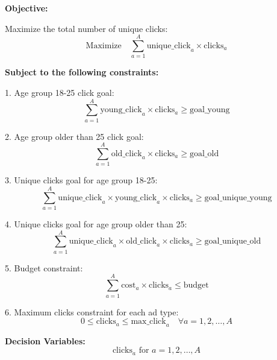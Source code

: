 \documentclass{article}
\begin{document}
\textbf{Objective:}

Maximize the total number of unique clicks:
\[
\text{Maximize} \quad \sum_{a=1}^{A} \text{unique\_click}_{a} \times \text{clicks}_{a}
\]

\textbf{Subject to the following constraints:}

1. Age group 18-25 click goal:
\[
\sum_{a=1}^{A} \text{young\_click}_{a} \times \text{clicks}_{a} \geq \text{goal\_young}
\]

2. Age group older than 25 click goal:
\[
\sum_{a=1}^{A} \text{old\_click}_{a} \times \text{clicks}_{a} \geq \text{goal\_old}
\]

3. Unique clicks goal for age group 18-25:
\[
\sum_{a=1}^{A} \text{unique\_click}_{a} \times \text{young\_click}_{a} \times \text{clicks}_{a} \geq \text{goal\_unique\_young}
\]

4. Unique clicks goal for age group older than 25:
\[
\sum_{a=1}^{A} \text{unique\_click}_{a} \times \text{old\_click}_{a} \times \text{clicks}_{a} \geq \text{goal\_unique\_old}
\]

5. Budget constraint:
\[
\sum_{a=1}^{A} \text{cost}_{a} \times \text{clicks}_{a} \leq \text{budget}
\]

6. Maximum clicks constraint for each ad type:
\[
0 \leq \text{clicks}_{a} \leq \text{max\_click}_{a} \quad \forall a = 1, 2, \ldots, A
\]

\textbf{Decision Variables:}
\[
\text{clicks}_{a} \text{ for } a = 1, 2, \ldots, A
\]
\end{document}
